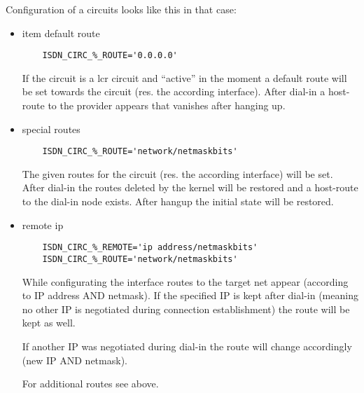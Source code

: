 Configuration of a circuits looks like this in that case:

\begin{itemize}
\item 
  item default route
  \begin{small}
\begin{example}
\begin{verbatim}
    ISDN_CIRC_%_ROUTE='0.0.0.0'
\end{verbatim}
\end{example}
  \end{small}
  
  If the circuit is a lcr circuit and ``active'' in the moment a default 
  route will be set towards the circuit (res. the according interface).
  After dial-in a host-route to the provider appears that vanishes after 
  hanging up.

  \item special routes
  \begin{small}
\begin{example}
\begin{verbatim}
    ISDN_CIRC_%_ROUTE='network/netmaskbits'
\end{verbatim}
\end{example}
  \end{small}
  
  The given routes for the circuit (res. the according interface) will 
  be set. After dial-in the routes deleted by the kernel will be restored 
  and a host-route to the dial-in node exists. After hangup the initial 
  state will be restored.


  \item remote ip
  \begin{small}
\begin{example}
\begin{verbatim}
    ISDN_CIRC_%_REMOTE='ip address/netmaskbits'
    ISDN_CIRC_%_ROUTE='network/netmaskbits'
\end{verbatim}
\end{example}
  \end{small}
  
  While configurating the interface routes to the target net appear 
  (according to IP address AND netmask). If the specified IP is kept 
  after dial-in (meaning no other IP is negotiated during connection 
  establishment) the route will be kept as well. 
  
  If another IP was negotiated during dial-in the route will change 
  accordingly (new IP AND netmask).
  
  For additional routes see above.


\end{itemize}

